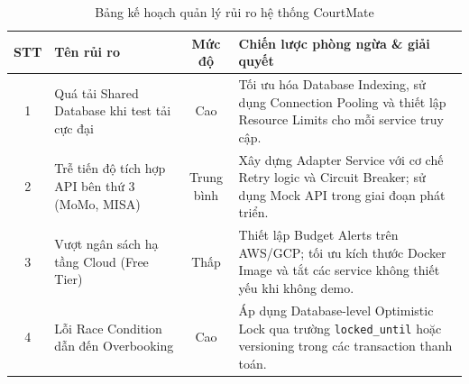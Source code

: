 \begin{table}[H]
    \centering
    \renewcommand{\arraystretch}{1.3}
    \begin{tabularx}{\textwidth}{|c|p{3.5cm}|c|X|}
    \hline
    \textbf{STT} & \textbf{Tên rủi ro} & \textbf{Mức độ} & \textbf{Chiến lược phòng ngừa \& giải quyết} \\ \hline
    1 & Quá tải Shared Database khi test tải cực đại & Cao & Tối ưu hóa Database Indexing, sử dụng Connection Pooling và thiết lập Resource Limits cho mỗi service truy cập. \\ \hline
    2 & Trễ tiến độ tích hợp API bên thứ 3 (MoMo, MISA) & Trung bình & Xây dựng Adapter Service với cơ chế Retry logic và Circuit Breaker; sử dụng Mock API trong giai đoạn phát triển. \\ \hline
    3 & Vượt ngân sách hạ tầng Cloud (Free Tier) & Thấp & Thiết lập Budget Alerts trên AWS/GCP; tối ưu kích thước Docker Image và tắt các service không thiết yếu khi không demo. \\ \hline
    4 & Lỗi Race Condition dẫn đến Overbooking & Cao & Áp dụng Database-level Optimistic Lock qua trường \texttt{locked\_until} hoặc versioning trong các transaction thanh toán. \\ \hline
    \end{tabularx}
    \caption{Bảng kế hoạch quản lý rủi ro hệ thống CourtMate}
    \label{tab:risk_management}
\end{table}

